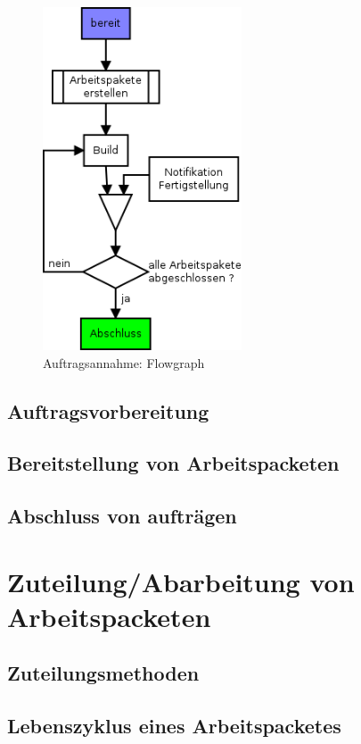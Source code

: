 \begin{figure}[ht] 
  \label{fig:lebenszyklus-auftrag-abarbeitung}
  \begin{center}
      \includegraphics[height=4in]{imageinput/lebenszyklus-auftrag-abarbeitung.png}
  \end{center}
  \caption{Auftragsannahme: Flowgraph}
\end{figure}

\subsection{Auftragsvorbereitung}
\subsection{Bereitstellung von Arbeitspacketen}
\subsection{Abschluss von auftr\"agen}


\section{Zuteilung/Abarbeitung von Arbeitspacketen}

\subsection{Zuteilungsmethoden}

\subsection{Lebenszyklus eines Arbeitspacketes}


